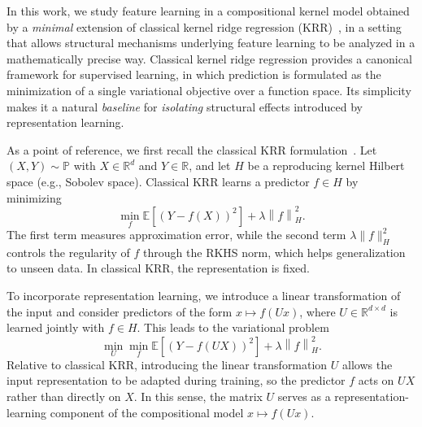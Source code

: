 \documentclass[sn-mathphys-num]{sn-jnl}%
\numberwithin{equation}{section}
\newcommand{\R}{\mathbb{R}}
\newcommand{\E}{\mathbb{E}}
\newcommand{\norm}[1]{\left\|{#1}\right\|} %
\theoremstyle{thmstyleone}%
\theoremstyle{thmstyletwo}%
\theoremstyle{thmstylethree}%
\begin{document}

In this work, we study feature learning in a compositional kernel model obtained by a \emph{minimal} extension of classical kernel ridge regression (KRR)~\cite{CuckerSm02}, in a setting that allows structural mechanisms underlying feature learning to be analyzed in a mathematically precise way. Classical kernel ridge regression provides a canonical framework for supervised learning, in which prediction is formulated as the minimization of a single variational objective over a function space. Its simplicity makes it a natural \emph{baseline} for \emph{isolating} structural effects introduced by representation learning.

As a point of reference, we first recall the classical KRR formulation~\cite{CuckerSm02}. 
Let $(X,Y) \sim \mathbb P$ with $X \in \mathbb R^d$ and
$Y \in \mathbb R$, and let $H$ be a reproducing kernel Hilbert space (e.g., Sobolev space).
Classical KRR learns a predictor $f \in H$ by minimizing
\begin{equation*}
	\min_f  \E[(Y - f(X))^2] + \lambda \norm{f}_H^2.
\end{equation*}
The first term measures approximation error, while the second term
$\lambda \|f\|_H^2$ controls the regularity of $f$
through the RKHS norm, which helps generalization to unseen data. In classical KRR, the 
representation is fixed. 

To incorporate representation learning, we introduce a linear transformation of the input and 
consider predictors of the form $x \mapsto f(Ux)$, where $U \in \R^{d \times d}$ is 
learned jointly with $f \in H$. This leads to the variational problem
\begin{equation}
\label{eqn:variational-objective-f}
		\min_U \min_f \E[(Y - f(U X))^2] + \lambda \norm{f}_H^2.
\end{equation}
Relative to classical KRR, introducing the linear transformation $U$ allows the 
input representation to be adapted during training, so the predictor $f$ acts on 
$UX$ rather than directly on $X$. In this sense, the matrix $U$ serves as a 
representation-learning component of the compositional model $x \mapsto f(Ux)$.  
\end{document}
